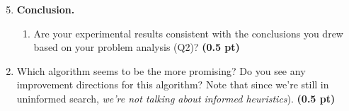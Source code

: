 \documentclass[11pt,a4paper]{report}
\begin{document}
\begin{enumerate}
	\setcounter{enumi}{4}
	\item \textbf{Conclusion.}
	\begin{enumerate}
		\item Are your experimental results consistent with the conclusions you drew
		based on your problem analysis (Q2)? \textbf{(0.5 pt)}
	\end{enumerate}
\end{enumerate}
\begin{answers}[4cm]
\end{answers}

\begin{enumerate}
	\setcounter{enumi}{4}
	\begin{enumerate}
		\setcounter{enumii}{1}
		\item Which algorithm seems to be the more promising? Do you see any improvement directions for this algorithm? Note that since we're still in uninformed search, \textit{we're not talking about informed heuristics}). \textbf{(0.5 pt)}
	\end{enumerate}
\end{enumerate}
\begin{answers}[4cm]
\end{answers}


%
\end{document}
